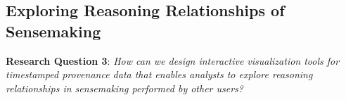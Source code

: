 %
%
%


\subsection{Exploring Reasoning Relationships of Sensemaking}
\textbf{Research Question 3}: \emph{How can we design interactive visualization tools for timestamped provenance data that enables analysts to explore reasoning relationships in sensemaking performed by other users?}

